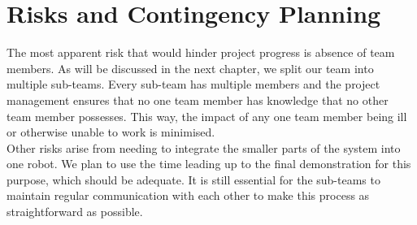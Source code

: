 \documentclass[a4paper,10pt,DIV10,openright,openbib]{scrreprt}
\begin{document}
\section{Risks and Contingency Planning}
The most apparent risk that would hinder project progress is absence of team members. 
As will be discussed in the next chapter, we split our team into multiple sub-teams. 
Every sub-team has multiple members and the project management ensures that no 
one team member has knowledge that no other 
team member possesses. This way, the impact of any one team member being ill or 
otherwise unable to work is minimised.\\
Other risks arise from needing to integrate 
the smaller parts of the system into one robot. We plan to use the time leading up to the final demonstration 
for this purpose, which should be adequate. It is still essential for the 
sub-teams to maintain regular communication with each other to make this process
as straightforward as possible.
\end{document}
